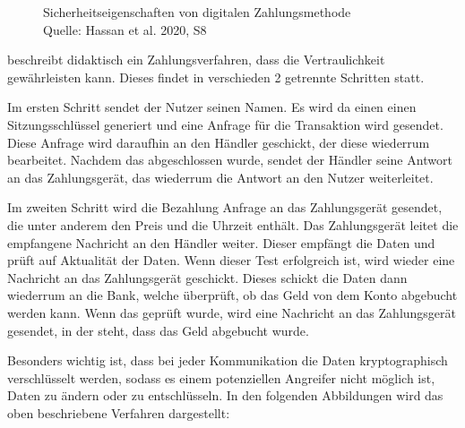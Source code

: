 \vfill
\begin{figure}[htb]
    \caption{Sicherheitseigenschaften von digitalen Zahlungsmethode \\ Quelle: Hassan et al. 2020, S8}
    \label{fig:refark_HARE}
\end{figure}
\vfill

\cite{refart:JTAS} beschreibt didaktisch ein Zahlungsverfahren, dass die Vertraulichkeit gewährleisten kann.
Dieses findet in verschieden 2 getrennte Schritten statt.

Im ersten Schritt sendet der Nutzer seinen Namen. Es wird da einen einen Sitzungsschlüssel generiert und 
eine Anfrage für die Transaktion wird gesendet. Diese Anfrage wird daraufhin an den Händler geschickt, der 
diese wiederrum bearbeitet. Nachdem das abgeschlossen wurde, sendet der Händler seine Antwort an das Zahlungsgerät, 
das wiederrum die Antwort an den Nutzer weiterleitet. 

Im zweiten Schritt wird die Bezahlung Anfrage an das Zahlungsgerät gesendet, die unter anderem den Preis und die 
Uhrzeit enthält. Das Zahlungsgerät leitet die empfangene Nachricht an den Händler weiter. Dieser empfängt die Daten 
und prüft auf Aktualität der Daten. Wenn dieser Test erfolgreich ist, wird wieder eine Nachricht an das Zahlungsgerät 
geschickt. Dieses schickt die Daten dann wiederrum an die Bank, welche überprüft, ob das Geld von dem Konto 
abgebucht werden kann. Wenn das geprüft wurde, wird eine Nachricht an das Zahlungsgerät gesendet, in der steht, 
dass das Geld abgebucht wurde. 

Besonders wichtig ist, dass bei jeder Kommunikation die Daten kryptographisch verschlüsselt werden, sodass es einem 
potenziellen Angreifer nicht möglich ist, Daten zu ändern oder zu entschlüsseln. In den folgenden Abbildungen wird
das oben beschriebene Verfahren dargestellt:

